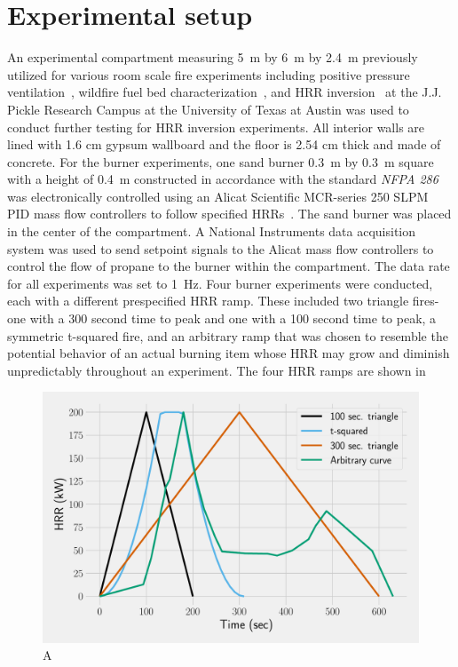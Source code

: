 \documentclass{article}
\begin{document}
\section{Experimental setup}
    An experimental compartment measuring 5~m by 6~m by 2.4~m previously utilized for various room scale fire experiments including positive pressure ventilation~\cite{Weinschenk:2011}, wildfire fuel bed characterization~\cite{Overholt:2014}, and HRR inversion~\cite{Kurzawski:2017} at the J.J. Pickle Research Campus at the University of Texas at Austin was used to conduct further testing for HRR inversion experiments. All interior walls are lined with 1.6 cm gypsum wallboard and the floor is 2.54 cm thick and made of concrete. 
    For the burner experiments, one sand burner 0.3~m by 0.3~m square with a height of 0.4~m constructed in accordance with the standard \textit{NFPA 286} was electronically controlled using an Alicat Scientific MCR-series 250 SLPM PID mass flow controllers to follow specified HRRs~\cite{NFPA:286}. The sand burner was placed in the center of the compartment. A National Instruments data acquisition system was used to send setpoint signals to the Alicat mass flow controllers to control the flow of propane to the burner within the compartment. The data rate for all experiments was set to 1~Hz. Four burner experiments were conducted, each with a different prespecified HRR ramp. These included two triangle fires- one with a 300 second time to peak and one with a 100 second time to peak, a symmetric t-squared fire, and an arbitrary ramp that was chosen to resemble the potential behavior of an actual burning item whose HRR may grow and diminish unpredictably throughout an experiment. The four HRR ramps are shown in  

    \begin{figure}[htb] \centering
    \includegraphics[width=.75\textwidth]{figures/training_ramps.pdf}
    \caption{A }
    \label{fig:transfer_learning_diagram}
    \end{figure}
\end{document}
